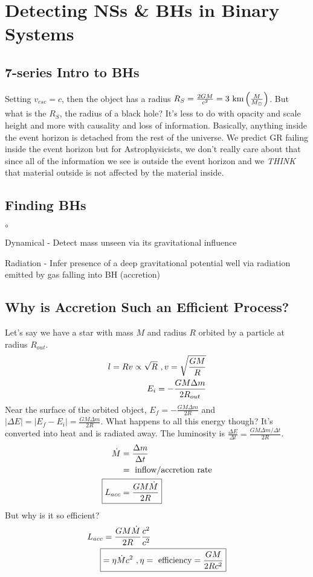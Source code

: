 \section{Detecting NSs \& BHs in Binary Systems}
\subsection{7-series Intro to BHs}
Setting $v_{esc} = c$, then the object has a radius $R_S = \frac{2GM}{c^2} = 3 \textrm{ km} \left( \frac{M}{M_\odot}\right)$. But what is the $R_S$, the radius of a black hole? It's less to do with opacity and scale height and more with causality and loss of information. Basically, anything inside the event horizon is detached from the rest of the universe. We predict GR failing inside the event horizon but for Astrophysicists, we don't really care about that since all of the information we see is outside the event horizon and we \textit{THINK} that material outside is not affected by the material inside. 

\subsection{Finding BHs}
\begin{list}{$\circ$}{}
\item Dynamical - Detect mass unseen via its gravitational influence
\item Radiation - Infer presence of a deep gravitational potential well via radiation emitted by gas falling into BH (accretion)
\end{list}

\subsection{Why is Accretion Such an Efficient Process?}
Let's say we have a star with mass $M$ and radius $R$ orbited by a particle at radius $R_{out}$.
\begin{align}
l = Rv \propto \sqrt{R}~, v = \sqrt{\frac{GM}{R}}\\
E_i = -\frac{GM\Delta m}{2R_{out}}
\end{align}
Near the surface of the orbited object, $E_f = -\frac{GM\Delta m}{2R}$ and $| \Delta E | = |E_f - E_i | = \frac{GM \Delta m}{2R}$. What happens to all this energy though? It's converted into heat and is radiated away. The luminosity is $\frac{\Delta E}{\Delta t} =  \frac{GM \Delta m / \Delta t}{2R}$. 
\begin{align}
\dot{M} &= \frac{\Delta m }{\Delta t}\\
&= \textrm{ inflow/accretion rate}\\
\Aboxed{L_{acc} &= \frac{GM \dot{M}}{2R}}
\end{align}
But why is it so efficient?
\begin{align}
L_{acc} &= \frac{G M \dot{M}}{2R} \frac{c^2}{c^2}\\
\Aboxed{&= \eta \dot{M} c^2~, \eta = \textrm{ efficiency} = \frac{GM}{2Rc^2}}
\end{align}
